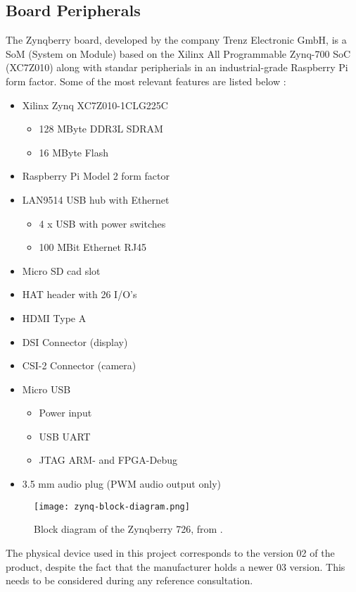 \subsection{Board Peripherals}

The Zynqberry board, developed by the company Trenz Electronic GmbH, is a SoM (System on Module) based on the Xilinx All Programmable Zynq-700 SoC (XC7Z010) along with standar peripherials in an industrial-grade Raspberry Pi form factor. Some of the most relevant features are listed below \cite{zynq-main}:

\begin{itemize}
	\item Xilinx Zynq XC7Z010-1CLG225C
	\begin{itemize}
		\item 128 MByte DDR3L SDRAM
		\item 16 MByte Flash
	\end{itemize}
	\item Raspberry Pi Model 2 form factor
	\item LAN9514 USB hub with Ethernet
	\begin{itemize}
		\item 4 x USB with power switches
		\item 100 MBit Ethernet RJ45
	\end{itemize}
	\item Micro SD cad slot
	\item HAT header with 26 I/O's
	\item HDMI Type A
	\item DSI Connector (display)
	\item CSI-2 Connector (camera)
	\item Micro USB
	\begin{itemize}
		\item Power input
		\item USB UART
		\item JTAG ARM- and FPGA-Debug
	\end{itemize}
	\item 3.5 mm audio plug (PWM audio output only)
\end{itemize}

\begin{figure}[htp]
	\centering
	\texttt{[image: zynq-block-diagram.png]}
	\caption{Block diagram of the Zynqberry 726, from \cite{zynq-trm}.}
	\label{fig:zynqblock}
\end{figure}

The physical device used in this project corresponds to the version 02 of the product, despite the fact that the manufacturer holds a newer 03 version. This needs to be considered during any reference consultation.

